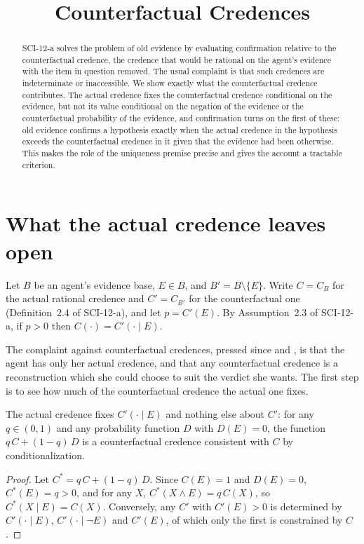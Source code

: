\documentclass{situationist-preprint}
\title{Counterfactual Credences}
\begin{document}
\maketitle

\begin{abstract}
SCI-12-a solves the problem of old evidence by evaluating confirmation relative to the counterfactual credence, the credence that would be rational on the agent's evidence with the item in question removed. The usual complaint is that such credences are indeterminate or inaccessible. We show exactly what the counterfactual credence contributes. The actual credence fixes the counterfactual credence conditional on the evidence, but not its value conditional on the negation of the evidence or the counterfactual probability of the evidence, and confirmation turns on the first of these: old evidence confirms a hypothesis exactly when the actual credence in the hypothesis exceeds the counterfactual credence in it given that the evidence had been otherwise. This makes the role of the uniqueness premise precise and gives the account a tractable criterion.
\end{abstract}

\section{What the actual credence leaves open}

Let $B$ be an agent's evidence base, $E\in B$, and $B'=B\setminus\{E\}$. Write $C=C_B$ for the actual rational credence and $C'=C_{B'}$ for the counterfactual one (Definition~2.4 of SCI-12-a), and let $p=C'(E)$. By Assumption~2.3 of SCI-12-a, if $p>0$ then $C(\cdot)=C'(\cdot\mid E)$.

The complaint against counterfactual credences, pressed since \citet{Glymour1980} and \citet{Howson1991}, is that the agent has only her actual credence, and that any counterfactual credence is a reconstruction which she could choose to suit the verdict she wants. The first step is to see how much of the counterfactual credence the actual one fixes.

\begin{lemma}\label{l:fix}
The actual credence fixes $C'(\cdot\mid E)$ and nothing else about $C'$: for any $q\in(0,1)$ and any probability function $D$ with $D(E)=0$, the function $q\,C+(1-q)\,D$ is a counterfactual credence consistent with $C$ by conditionalization.
\end{lemma}

\begin{proof}
Let $C^*=q\,C+(1-q)\,D$. Since $C(E)=1$ and $D(E)=0$, $C^*(E)=q>0$, and for any $X$, $C^*(X\wedge E)=q\,C(X)$, so $C^*(X\mid E)=C(X)$. Conversely, any $C'$ with $C'(E)>0$ is determined by $C'(\cdot\mid E)$, $C'(\cdot\mid\neg E)$ and $C'(E)$, of which only the first is constrained by $C$.
\end{proof}
\end{document}
